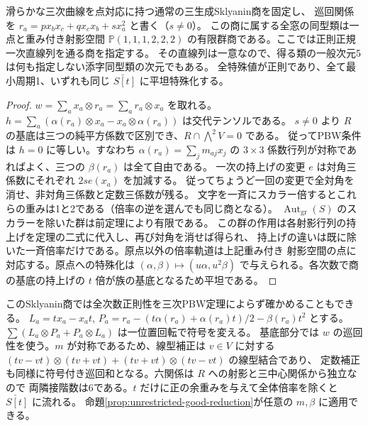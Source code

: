 \begin{corollary}\label{cor:sklyanin-central-classification}
滑らかな三次曲線を点対応に持つ通常の三生成Sklyanin商を固定し、
巡回関係を $r_a=p x_bx_c+q x_cx_b+s x_a^2$ と書く（$s\ne0$）。
この商に属する全窓の同型類は一点と重み付き射影空間
$\mathbb P(1,1,1,2,2,2)$ の有限群商である。ここでは正則正規一次直線列を通る商を指定する。
その直線列は一意なので、得る類の一般次元5は何も指定しない添字同型類の次元でもある。
全特殊値が正則であり、全て最小周期1、いずれも同じ $\check{S[t]}$ に平坦特殊化する。
\end{corollary}
\begin{proof}
$w=\sum_a x_a\otimes r_a=\sum_a r_a\otimes x_a$ を取れる。
$h=\sum_a(\alpha(r_a)\otimes x_a-x_a\otimes\alpha(r_a))$ は交代テンソルである。
$s\ne0$ より $R$ の基底は三つの純平方係数で区別でき、$R\cap\bigwedge^2 V=0$ である。
従ってPBW条件は $h=0$ に等しい。すなわち $\alpha(r_a)=\sum_j m_{aj}x_j$ の
$3\times3$ 係数行列が対称であればよく、三つの $\beta(r_a)$ は全て自由である。
一次の持上げの変更 $e$ は対角三係数にそれぞれ $2s e(x_a)$ を加減する。
従ってちょうど一回の変更で全対角を消せ、非対角三係数と定数三係数が残る。
文字を一斉にスカラー倍するとこれらの重みは1と2である（倍率の逆を選んでも同じ商となる）。
$\operatorname{Aut}_{\mathrm{gr}}(S)$ のスカラーを除いた群は前定理により有限である。
この群の作用は各射影行列の持上げを定理の二式に代入し、再び対角を消せば得られ、
持上げの違いは既に除いた一斉倍率だけである。原点以外の倍率軌道は上記重み付き
射影空間の点に対応する。原点への特殊化は $(\alpha,\beta)\mapsto
(u\alpha,u^2\beta)$ で与えられる。各次数で商の基底の持上げの $t$ 倍が族の基底となるため平坦である。
\end{proof}

このSklyanin商では全次数正則性を三次PBW定理によらず確かめることもできる。
$L_a=t x_a-x_a t$,
$P_a=r_a-(t\alpha(r_a)+\alpha(r_a)t)/2-\beta(r_a)t^2$ とする。
$\sum(L_a\otimes P_a+P_a\otimes L_a)$ は一位置回転で符号を変える。
基底部分では $w$ の巡回性を使う。$m$ が対称であるため、線型補正は
$v\in V$ に対する $(tv-vt)\otimes(tv+vt)+(tv+vt)\otimes(tv-vt)$ の線型結合であり、
定数補正も同様に符号付き巡回和となる。六関係は $R$ への射影と三中心関係から独立なので
両隣接階数は6である。$t$ だけに正の余重みを与えて全体倍率を除くと $\check{S[t]}$ に流れる。
命題\ref{prop:unrestricted-good-reduction}が任意の $m,\beta$ に適用できる。

